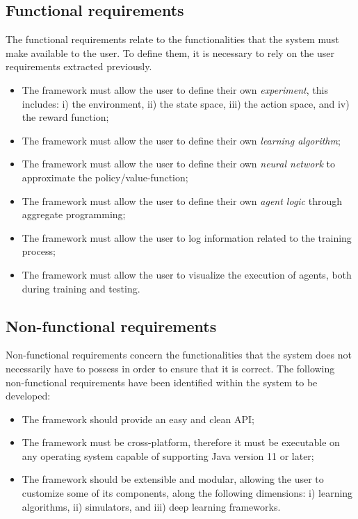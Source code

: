 \documentclass[12pt,a4paper,openright,twoside]{book}
\begin{document}
\subsection*{Functional requirements}
The functional requirements relate to the functionalities that the system must make available to the user. 
    To define them, it is necessary to rely on the user requirements extracted previously.
\begin{itemize}
    \item The framework must allow the user to define their own \emph{experiment}, this includes: 
            i) the environment, 
            ii) the state space, 
            iii) the action space, and
            iv) the reward function;
    \item The framework must allow the user to define their own \emph{learning algorithm};
    \item The framework must allow the user to define their own \emph{neural network} to approximate the policy/value-function;
    \item The framework must allow the user to define their own \emph{agent logic} through aggregate programming;
    \item The framework must allow the user to log information related to the training process;
    \item The framework must allow the user to visualize the execution of agents, both during training and testing.
\end{itemize}

\subsection*{Non-functional requirements}
Non-functional requirements concern the functionalities that the system does not necessarily have to possess in order to ensure that it is correct.
The following non-functional requirements have been identified within the system to be developed:
\begin{itemize}
    \item The framework should provide an easy and clean API;
    \item The framework must be cross-platform, therefore it must be executable on any operating 
        system capable of supporting Java version 11 or later;
    \item The framework should be extensible and modular, allowing the user to customize some of its 
        components, along the following dimensions: 
        i) learning algorithms, 
        ii) simulators, and 
        iii) deep learning frameworks.
\end{itemize}
\end{document}
